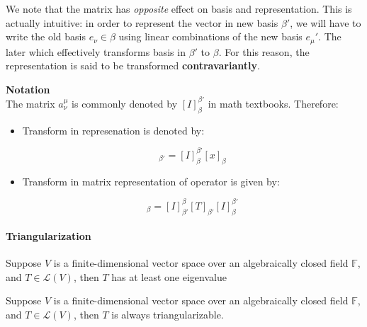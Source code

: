 We note that the matrix has \textit{opposite} effect on basis and representation. This is actually intuitive: in order to represent the vector in new basis $\beta'$, we will have to write the old basis $e_\nu \in \beta$ using linear combinations of the new basis $e_{\mu}'$. The later which effectively transforms basis in $\beta'$ to $\beta$. For this reason, the representation is said to be transformed \textbf{contravariantly}.

\begin{framed}
\textbf{Notation}\\
The matrix $a_{\nu}^{\mu}$ is commonly denoted by $[I]_{\beta}^{\beta'}$ in math textbooks. Therefore:

\begin{itemize}
\item Transform in represenation is denoted by:

\begin{equation}
[x]_{\beta'}=[I]_{\beta}^{\beta'}[x]_{\beta}
\end{equation}


\item Transform in matrix representation of operator is given by:

\begin{equation}
[T]_{\beta}=[I]_{\beta'}^{\beta}[T]_{\beta'}[I]_{\beta}^{\beta'}
\end{equation}
\end{itemize}
\end{framed}

\paragraph{Triangularization}

\begin{proposition}Suppose $V$ is a finite-dimensional vector space over an algebraically closed field $\mathbb{F}$, and $T\in \mathcal L(V)$, then $T$ has at least one eigenvalue

\end{proposition}\begin{theorem}Suppose $V$ is a finite-dimensional vector space over an algebraically closed field $\mathbb{F}$, and $T\in \mathcal L(V)$, then $T$ is always triangularizable.

\end{theorem}